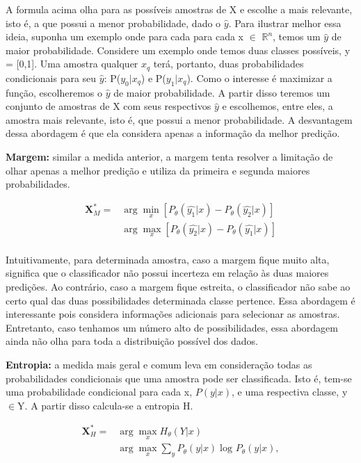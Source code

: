 A formula acima olha para as possíveis amostras de X e escolhe a mais relevante, isto é, a que possui a menor probabilidade, dado o $\hat{y}$. Para ilustrar melhor essa ideia, suponha um exemplo onde para cada para cada x $\in$ $\mathbb{R}^n$, temos um $\hat{y}$ de maior probabilidade. Considere um exemplo onde temos duas classes possíveis, y = [0,1]. Uma amostra qualquer $x_q$ terá, portanto, duas probabilidades condicionais para seu $\hat{y}$: P($y_0 \lvert x_q$) e P($y_1 \lvert x_q$). Como o interesse é maximizar a função, escolheremos o $\hat{y}$ de maior probabilidade. A partir disso teremos um conjunto de amostras de X com seus respectivos $\hat{y}$ e escolhemos, entre eles, a amostra mais relevante, isto é, que possui a menor probabilidade. A desvantagem dessa abordagem é que ela considera apenas a informação da melhor predição.  


\textbf{Margem:} similar a medida anterior, a margem tenta resolver a limitação de olhar apenas a melhor predição e utiliza da primeira e segunda maiores probabilidades. 


\begin{align*}
\textbf{X}^*_{M} = &\arg\min_{x}[ P_{\theta} (\hat{y_{1}}\lvert x) - P_{\theta} (\hat{y_{2}}\lvert x)]\\
&\arg\max_{x}[ P_{\theta} (\hat{y_{2}}\lvert x) - P_{\theta} (\hat{y_{1}}\lvert x)]\\
\end{align*}

Intuitivamente, para determinada amostra, caso a margem fique muito alta, significa que o classificador não possui incerteza em relação às duas maiores predições. Ao contrário, caso a margem fique estreita, o classificador não sabe ao certo qual das duas possibilidades determinada classe pertence. Essa abordagem é interessante pois considera informações adicionais para selecionar as amostras. Entretanto, caso tenhamos um número alto de possibilidades, essa abordagem ainda não olha para toda a distribuição possível dos dados.

\textbf{Entropia:} a medida mais geral e comum leva em consideração todas as probabilidades condicionais que uma amostra pode ser classificada. Isto é, tem-se uma probabilidade condicional para cada x, $P(y\lvert x)$, e uma respectiva classe, y$\in$Y. A partir disso calcula-se a entropia H.

\begin{align*}
\textbf{X}^*_{H} = &\arg\max_{x} H_{\theta}  (Y\lvert x)\\
&\arg\max_{x} \sum_{y} P_{\theta}  (y\lvert x) \log_{} P_{\theta}  (y\lvert x),\\
\end{align*}

